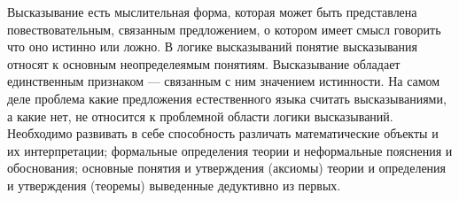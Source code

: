 Высказывание есть мыслительная форма, которая может быть представлена
повествовательным, связанным предложением, о котором имеет смысл говорить что
оно истинно или ложно.
В логике высказываний понятие высказывания относят к основным неопределеямым
понятиям. Высказывание обладает единственным признаком --- связанным с ним
значением истинности.
На самом деле проблема какие предложения естественного языка считать
высказываниями, а какие нет, не относится к проблемной области логики
высказываний.
Необходимо развивать в себе способность различать математические объекты и их
интерпретации; формальные определения теории и неформальные пояснения и
обоснования; основные понятия и утверждения (аксиомы) теории и определения и
утверждения (теоремы) выведенные дедуктивно из первых.
